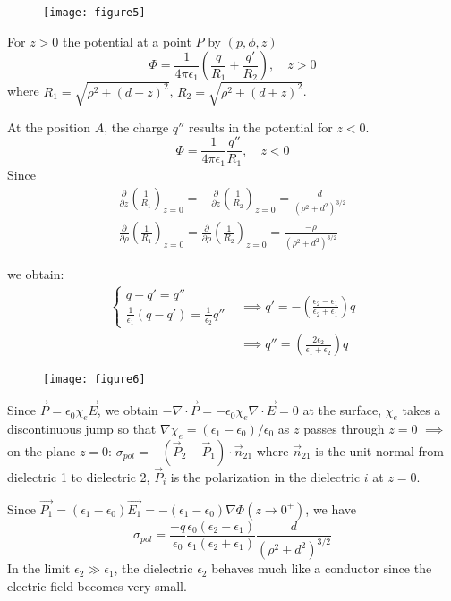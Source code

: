 \documentclass{article}
\begin{document}
	\begin{figure}[h]
		\centering
		\texttt{[image: figure5]}
		\caption{}
		\label{fig:figure5}
	\end{figure}
	
	For $z>0$ the potential at a point $P$ by $(p, \phi, z)$
	\[
	\Phi = \frac{1}{4\pi\epsilon_1} \left( \frac{q}{R_1} + \frac{q'}{R_2} \right), \quad z>0
	\]
	where $R_1 = \sqrt{\rho^2+(d-z)^2}$, $R_2=\sqrt{\rho^2+(d+z)^2}$.
	
	At the position $A$, the charge $q''$ results in the potential for $z<0$.
	\[
	\Phi = \frac{1}{4\pi\epsilon_1} \frac{q''}{R_1}, \quad z<0
	\]
	Since
	\begin{gather*}
		\frac{\partial}{\partial z} \left( \frac{1}{R_1} \right)_{z=0} = -\frac{\partial}{\partial z} \left( \frac{1}{R_2} \right)_{z=0} = \frac{d}{(\rho^2+d^2)^{3/2}} \\
		\frac{\partial}{\partial \rho} \left( \frac{1}{R_1} \right)_{z=0} = \frac{\partial}{\partial \rho} \left( \frac{1}{R_2} \right)_{z=0} = \frac{-\rho}{(\rho^2+d^2)^{3/2}}
	\end{gather*}
	
	we obtain:
	\begin{align*}
		\begin{cases}
			q - q' = q'' \\
			\frac{1}{\epsilon_1}(q-q') = \frac{1}{\epsilon_2} q''
		\end{cases}
		&\implies q' = - \left( \frac{\epsilon_2-\epsilon_1}{\epsilon_2+\epsilon_1} \right) q \\
		&\implies q'' = \left( \frac{2\epsilon_2}{\epsilon_1+\epsilon_2} \right) q
	\end{align*}
	
	\begin{figure}[h]
		\centering
		\texttt{[image: figure6]}
		\caption{}
		\label{fig:figure6}
	\end{figure}
	
	Since $\vec{P} = \epsilon_0 \chi_e \vec{E}$, we obtain $-\nabla \cdot \vec{P} = -\epsilon_0 \chi_e \nabla \cdot \vec{E}=0$ at the surface, $\chi_e$ takes a discontinuous jump so that $\nabla \chi_e = (\epsilon_1 - \epsilon_0)/ \epsilon_0$ as $z$ passes through $z=0$
	$\implies$ on the plane $z=0$: $\sigma_{pol} = -(\vec{P}_2 - \vec{P}_1) \cdot \vec{n}_{21}$ where $\vec{n}_{21}$ is the unit normal from dielectric 1 to dielectric 2, $\vec{P}_i$ is the polarization in the dielectric $i$ at $z=0$.
	
	Since $\vec{P_1} = (\epsilon_1 - \epsilon_0) \vec{E_1} = -(\epsilon_1-\epsilon_0) \nabla \Phi(z\to 0^+)$, we have
	\[
	\sigma_{pol} = \frac{-q}{\epsilon_0} \frac{\epsilon_0(\epsilon_2-\epsilon_1)}{\epsilon_1(\epsilon_2+\epsilon_1)} \frac{d}{(\rho^2+d^2)^{3/2}}
	\]
	In the limit $\epsilon_2 \gg \epsilon_1$, the dielectric $\epsilon_2$ behaves much like a conductor since the electric field becomes very small.
	
\end{document}
